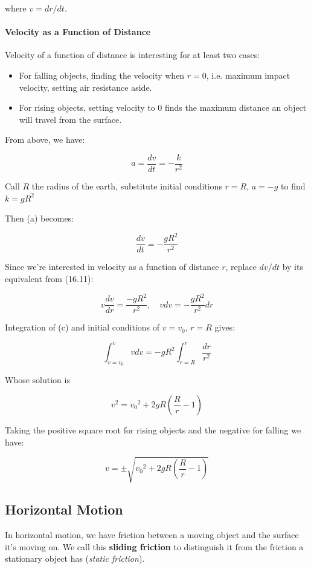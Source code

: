 \documentclass{article}
\begin{document}
where $v = dr/dt$.

\paragraph{Velocity as a Function of Distance}

Velocity of a function of distance is interesting for at least two cases:

\begin{itemize}
\item For falling objects, finding the velocity when $r = 0$, i.e. maximum impact velocity, setting air resistance aside.
\item For rising objects, setting velocity to $0$ finds the maximum distance an object will travel from the surface.
\end{itemize}

From above, we have:

\[ \tag{a} a = \frac{dv}{dt} = -\frac{k}{r^2} \]

Call $R$ the radius of the earth, substitute initial conditions $r=R$, $a=-g$ to find $k=gR^2$

Then (a) becomes:

\[ \tag{b} \frac{dv}{dt} = -\frac{gR^2}{r^2} \]

Since we're interested in velocity as a function of distance $r$, replace $dv/dt$ by its equivalent from (16.11):

\[ \tag{c} v\frac{dv}{dr} = \frac{-gR^2}{r^2}, \quad vdv = -\frac{gR^2}{r^2}dr \]

Integration of (c) and initial conditions of $v = v_0$, $r = R$ gives:

\[ \tag{d} \int_{v=v_0}^{v} vdv = -gR^2 \int_{r=R}^{r} \frac{dr}{r^2} \]

Whose solution is

\[ \tag{e} v^2 = {v_0}^2 + 2gR(\frac{R}{r} - 1) \]

Taking the positive square root for rising objects and the negative for falling we have:

\[ \tag{f} v = \pm \sqrt{ {v_0}^2 + 2gR(\frac{R}{r} - 1)} \] 

\subsection{Horizontal Motion}

In horizontal motion, we have friction between a moving object and the surface it's moving on. We call this \textbf{sliding friction} to distinguish it from the friction a stationary object has (\emph{static friction}).
\end{document}
